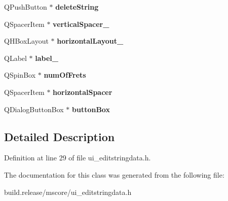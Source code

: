 \begin{DoxyCompactItemize}
\item 
\mbox{\label{class_ui___edit_string_data_base_a4dd36d281713954adcd88bed96a19b15}} 
Q\+Push\+Button $\ast$ {\bfseries delete\+String}
\item 
\mbox{\label{class_ui___edit_string_data_base_a78599d5ced2b0716d1c1327bb106aef7}} 
Q\+Spacer\+Item $\ast$ {\bfseries vertical\+Spacer\+\_}
\item 
\mbox{\label{class_ui___edit_string_data_base_a337519f0e629e44572158fec55857b70}} 
Q\+H\+Box\+Layout $\ast$ {\bfseries horizontal\+Layout\+\_}
\item 
\mbox{\label{class_ui___edit_string_data_base_aeaf8f23a4d8791a27aeec50e2c40d4ae}} 
Q\+Label $\ast$ {\bfseries label\+\_}
\item 
\mbox{\label{class_ui___edit_string_data_base_ac87e790ac6241138aafa506766e82a39}} 
Q\+Spin\+Box $\ast$ {\bfseries num\+Of\+Frets}
\item 
\mbox{\label{class_ui___edit_string_data_base_a2183e23808bdf389d6e73de87a4299da}} 
Q\+Spacer\+Item $\ast$ {\bfseries horizontal\+Spacer}
\item 
\mbox{\label{class_ui___edit_string_data_base_aa7bdfce3b16f1759c41e20cb83891485}} 
Q\+Dialog\+Button\+Box $\ast$ {\bfseries button\+Box}
\end{DoxyCompactItemize}


\subsection{Detailed Description}


Definition at line 29 of file ui\+\_\+editstringdata.\+h.



The documentation for this class was generated from the following file\+:\begin{DoxyCompactItemize}
\item 
build.\+release/mscore/ui\+\_\+editstringdata.\+h\end{DoxyCompactItemize}
